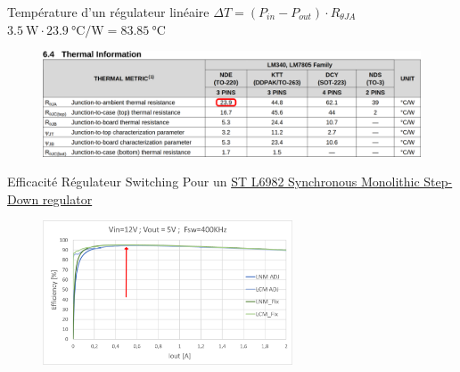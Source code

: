 \begin{frame}{Température d'un régulateur linéaire}
    \centering
     {
        $\Delta T = (P_{in} - P_{out}) \cdot R_{\theta JA}$\\
        \vspace{6pt}
        $\SI{3.5}{\watt} \cdot \SI{23.9}{\celsius\per\watt} = \SI{83.85}{\celsius}$
    }

    \begin{figure}
        \includegraphics[width=\textwidth, height=0.75\textheight, keepaspectratio]{pictures/7805-thermal-information.png}
    \end{figure}
\end{frame}

\begin{frame}{Efficacité Régulateur Switching}
    Pour un \href{https://www.st.com/resource/en/datasheet/l6982.pdf}{ST L6982 Synchronous Monolithic Step-Down regulator}

    \begin{figure}
        \includegraphics[width=0.66\textwidth, height=0.75\textheight, keepaspectratio]{pictures/l6982-efficiency-curve.png}
    \end{figure}
\end{frame}


